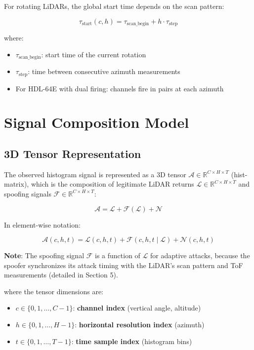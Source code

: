 \documentclass[11pt]{article}
\begin{document}
For rotating LiDARs, the global start time depends on the scan pattern:

\begin{equation}
\tau_{\text{start}}(c, h) = \tau_{\text{scan\_begin}} + h \cdot \tau_{\text{step}}
\end{equation}

where:
\begin{itemize}
    \item $\tau_{\text{scan\_begin}}$: start time of the current rotation
    \item $\tau_{\text{step}}$: time between consecutive azimuth measurements
    \item For HDL-64E with dual firing: channels fire in pairs at each azimuth
\end{itemize}

\section{Signal Composition Model}

\subsection{3D Tensor Representation}

The observed histogram signal is represented as a 3D tensor $\bm{\mathcal{A}} \in \mathbb{R}^{C \times H \times T}$ (hist-matrix), which is the composition of legitimate LiDAR returns $\bm{\mathcal{L}} \in \mathbb{R}^{C \times H \times T}$ and spoofing signals $\bm{\mathcal{F}} \in \mathbb{R}^{C \times H \times T}$:

\begin{equation}
\bm{\mathcal{A}} = \bm{\mathcal{L}} + \bm{\mathcal{F}}(\bm{\mathcal{L}}) + \bm{\mathcal{N}}
\end{equation}

In element-wise notation:

\begin{equation}
\mathcal{A}(c, h, t) = \mathcal{L}(c, h, t) + \mathcal{F}(c, h, t \mid \mathcal{L}) + \mathcal{N}(c, h, t)
\end{equation}

\textbf{Note}: The spoofing signal $\bm{\mathcal{F}}$ is a function of $\bm{\mathcal{L}}$ for adaptive attacks, because the spoofer synchronizes its attack timing with the LiDAR's scan pattern and ToF measurements (detailed in Section 5).

where the tensor dimensions are:
\begin{itemize}
    \item $c \in \{0, 1, \ldots, C-1\}$: \textbf{channel index} (vertical angle, altitude)
    \item $h \in \{0, 1, \ldots, H-1\}$: \textbf{horizontal resolution index} (azimuth)
    \item $t \in \{0, 1, \ldots, T-1\}$: \textbf{time sample index} (histogram bins)
\end{itemize}
\end{document}
